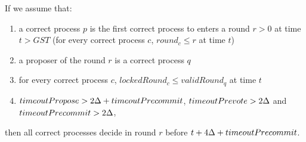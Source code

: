 \begin{lemma}
	\label{lemma:round-synchronisation}
If we assume that:
\begin{enumerate}
	\item a correct process $p$ is the first correct process to enters a round $r>0$ at time $t > GST$ (for every correct process $c$, $round_c \le r$ at time $t$)
	\item a proposer of the round $r$ is a correct process $q$ 
	\item for every correct process $c$, $lockedRound_c \le validRound_q$ at time $t$
	\item $timeoutPropose > 2\Delta + timeoutPrecommit$, $timeoutPrevote > 2\Delta$ and $timeoutPrecommit > 2\Delta$,
\end{enumerate}
then all correct processes decide in round $r$ before $t + 4\Delta + timeoutPrecommit$.  
\end{lemma}	

